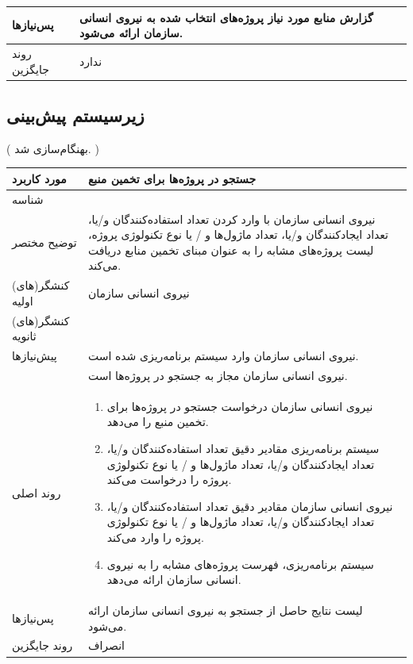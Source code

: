 \begin{table}[H]
\begin{tabular}{|p{3cm}|p{10cm}|}
		پس‌نیازها &
		گزارش منابع مورد نیاز پروژه‌های انتخاب شده به نیروی انسانی سازمان ارائه می‌شود. \\
		\hline
		
		روند جایگزین
		& ندارد \\
		\hline
		
	\end{tabular}
\end{table}

\newpage
\subsection{زیرسیستم پیش‌بینی}

({\color{red} بهنگام‌سازی شد. })
\begin{table}[H]
	\centering
	\begin{tabular}{|p{3cm}|p{10cm}|}
		\hline
		مورد کاربرد & جستجو در پروژه‌ها برای تخمین منبع  \\
		\hline
		شناسه & 
		\stepcounter{usecase_ID}
		\arabic{usecase_ID} \\
		\hline
		توضیح مختصر & نیروی انسانی سازمان با وارد کردن تعداد استفاده‌کنندگان و/یا، تعداد ایجادکنندگان و/یا، تعداد ماژول‌ها و / یا نوع تکنولوژی پروژه، لیست پروژه‌های مشابه را به عنوان مبنای تخمین منابع دریافت می‌کند. \\
		\hline
		کنشگر(های) اولیه & نیروی انسانی سازمان \\
		\hline
		کنشگر(های) ثانویه &  \\
		\hline
		پیش‌نیازها & نیروی انسانی سازمان وارد سیستم برنامه‌ریزی شده است. \\
		& نیروی انسانی سازمان مجاز به جستجو در پروژه‌ها است. \\
		\hline
				
		روند اصلی &
		\begin{enumerate}[topsep=0cm,leftmargin=0.5cm]
			\item نیروی انسانی سازمان درخواست جستجو در پروژه‌ها برای تخمین منبع را می‌دهد.
			\item سیستم برنامه‌ریزی مقادیر  دقیق تعداد استفاده‌کنندگان و/یا، تعداد ایجادکنندگان و/یا، تعداد ماژول‌ها و / یا نوع تکنولوژی پروژه را درخواست می‌کند.
			\item نیروی انسانی سازمان مقادیر دقیق تعداد استفاده‌کنندگان و/یا، تعداد ایجادکنندگان و/یا، تعداد ماژول‌ها و / یا نوع تکنولوژی پروژه را وارد می‌کند. 
			\item سیستم برنامه‌ریزی، فهرست پروژه‌های مشابه را به نیروی انسانی سازمان ارائه می‌دهد. 
		\end{enumerate} \\
		
		\hline
		
		
		پس‌نیازها & لیست نتایج حاصل از جستجو به نیروی انسانی سازمان ارائه می‌شود. \\
		\hline
		
		
		روند جایگزین & انصراف \\
		\hline
	\end{tabular}
\end{table}

